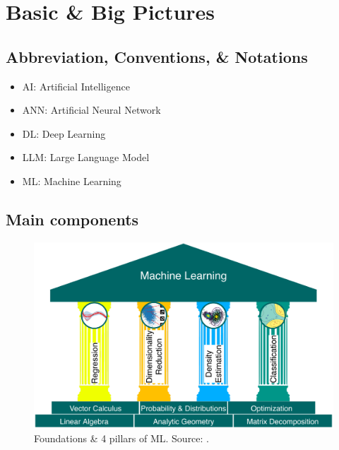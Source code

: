 \documentclass{article}
\begin{document}
\section{Basic \& Big Pictures}

\subsection{Abbreviation, Conventions, \& Notations}

\begin{itemize}
	\item AI: Artificial Intelligence
	\item ANN: Artificial Neural Network
	\item DL: Deep Learning
	\item LLM: Large Language Model
	\item ML: Machine Learning
\end{itemize}


\subsection{Main components}

\begin{figure}[H]
	\centering
	\includegraphics[width=12cm]{4_ML_pillars}
	\caption{Foundations \& 4 pillars of ML. Source: \cite[Fig. 1.1, p. 14]{Deisenroth_Faisal_Ong2024}.}
\end{figure}
\end{document}
